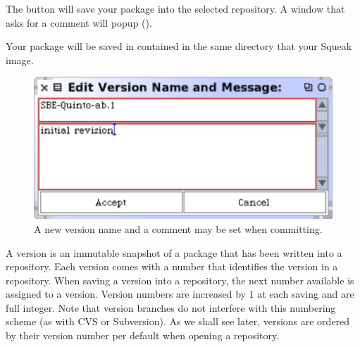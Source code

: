 \documentclass[a4paper,10pt,twoside]{book}
\begin{document}
The  button will save your package into the selected repository. A window that asks for a comment will popup ().


Your package will be saved in  contained in the same directory that your Squeak image.



\begin{figure}[ht]\centering
	\includegraphics[width=.55\linewidth]{saving.png}
	\caption{A new version name and a comment may be set when committing.}
\end{figure}

A version is an immutable snapshot of a package that has been written into a repository. Each version comes with a number that identifies the version in a repository. When saving a version into a repository, the next number available is assigned to a version. Version numbers are increased by 1 at each saving and are full integer. Note that version branches do not interfere with this numbering scheme (as with CVS or Subversion). As we shall see later, versions are ordered by their version number per default when opening a repository.

\end{document}
